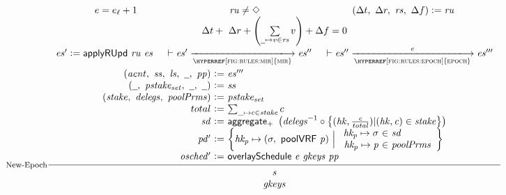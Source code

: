 \begin{figure}[ht]
  \begin{equation}\label{eq:new-epoch}
    \inference[New-Epoch]
    {
      e = e_\ell + 1
      &
      \var{ru} \neq \Nothing
      &
      (\Delta t,~\Delta r,~\var{rs},~\Delta f)\leteq\var{ru}
      \\
      \Delta t+~\Delta r+\left(\sum\limits_{\wcard\mapsto v\in\var{rs}} v\right)+\Delta f=0
      \\
      \var{es'}\leteq\fun{applyRUpd}~\var{ru}~\var{es}
      &
      {
        \vdash
        \var{es'}
          \trans{\hyperref[fig:rules:mir]{mir}}{}\var{es''}
      }
      &
      {
        \vdash
        \var{es''}
          \trans{\hyperref[fig:rules:epoch]{epoch}}{\var{e}}\var{es'''}
      }
      \\~\\
      {\begin{array}{r@{~\leteq~}l}
          (\var{acnt},~\var{ss},~\var{ls},~\wcard,~\var{pp}) & \var{es'''} \\
         (\wcard,~\var{pstake_{set}},~\wcard,~\wcard) & \var{ss} \\
         (\var{stake},~\var{delegs},~\var{poolPrms}) & \var{pstake_{set}} \\
         total & \sum_{\_ \mapsto c\in\var{stake}} c \\
          \var{sd} & \fun{aggregate_{+}}~\left(\var{delegs}^{-1}\circ
                     \left\{
                     (\var{hk}, \frac{\var{c}}{\var{total}}) \vert (\var{hk},
                     \var{c}) \in \var{stake}
                 \right\}\right) \\
          \var{pd'} &
            \left\{\var{hk_p}\mapsto(\sigma,~\fun{poolVRF}~\var{p})
            ~\Big\vert~
            {
              \begin{array}{r@{~\in~}l}
                \var{hk_p}\mapsto\sigma & \var{sd} \\
                \var{hk_p}\mapsto\var{p} & \var{poolPrms}
              \end{array}
            }
            \right\}\\
          \var{osched'} & \overlaySchedule{e}{gkeys}{pp} \\
       \end{array}}
    }
    {
      {\begin{array}{c}
         \var{s} \\
         \var{gkeys} \\
       \end{array}}
}
\end{equation}
\end{figure}
